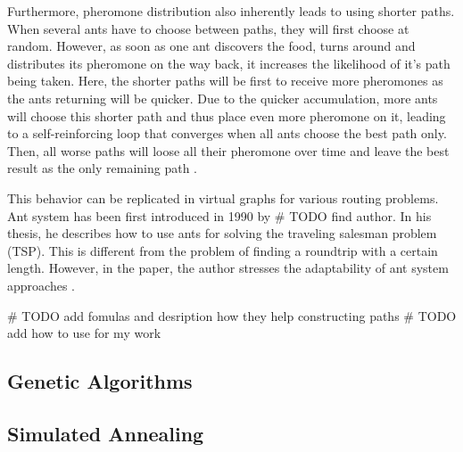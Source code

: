 Furthermore, pheromone distribution also inherently leads to using shorter paths. 
When several ants have to choose between paths, they will first choose at random.
However, as soon as one ant discovers the food, turns around and distributes its pheromone on the way back, it increases the likelihood of it's path being taken.
Here, the shorter paths will be first to receive more pheromones as the ants returning will be quicker.
Due to the quicker accumulation, more ants will choose this shorter path and thus place even more pheromone on it, leading to a self-reinforcing loop that converges when all ants choose the best path only.
Then, all worse paths will loose all their pheromone over time and leave the best result as the only remaining path \cite{dorigo_ant_1996}.

This behavior can be replicated in virtual graphs for various routing problems.
Ant system has been first introduced in 1990 by \# TODO find author.
In his thesis, he describes how to use ants for solving the traveling salesman problem (TSP).
This is different from the problem of finding a roundtrip with a certain length.
However, in the paper, the author stresses the adaptability of ant system approaches \cite{dorigo_ant_1996}.

\# TODO add fomulas and desription how they help constructing paths
\# TODO add how to use for my work

\subsection{Genetic Algorithms}
\label{subsec:geneticAlgorithmsBackground}

\subsection{Simulated Annealing}
\label{subsec:simulatedAnnealingBackground}